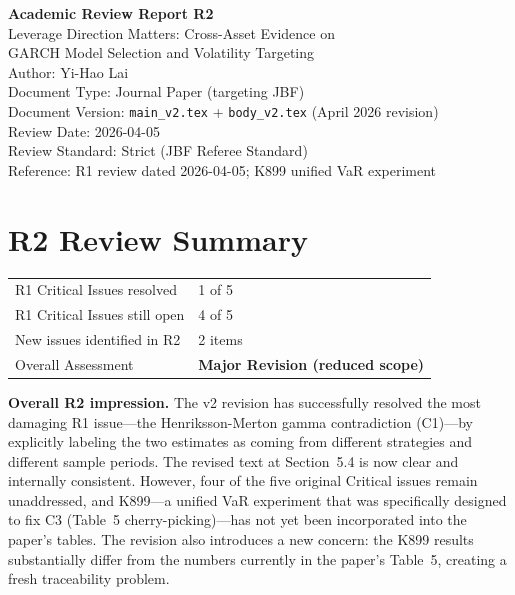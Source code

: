 \documentclass[12pt,a4paper]{article}
\begin{document}
\begin{center}
{\Large\bfseries Academic Review Report R2}\\[0.5em]
{\large Leverage Direction Matters: Cross-Asset Evidence on\\GARCH Model Selection and Volatility Targeting}\\[0.5em]
{\normalsize Author: Yi-Hao Lai}\\[0.3em]
{\normalsize Document Type: Journal Paper (targeting JBF)}\\
{\normalsize Document Version: \texttt{main\_v2.tex} + \texttt{body\_v2.tex} (April 2026 revision)}\\
{\normalsize Review Date: 2026-04-05}\\
{\normalsize Review Standard: Strict (JBF Referee Standard)}\\
{\normalsize Reference: R1 review dated 2026-04-05; K899 unified VaR experiment}
\end{center}

\bigskip

\section*{R2 Review Summary}

\begin{tabular}{ll}
\textcolor{resolved}{R1 Critical Issues resolved} & 1 of 5 \\
\textcolor{errorred}{R1 Critical Issues still open} & 4 of 5 \\
\textcolor{warncolor}{New issues identified in R2} & 2 items \\
Overall Assessment & \textbf{Major Revision (reduced scope)} \\
\end{tabular}

\medskip

\noindent\textbf{Overall R2 impression.} The v2 revision has successfully resolved the most damaging R1 issue---the Henriksson-Merton gamma contradiction (C1)---by explicitly labeling the two estimates as coming from different strategies and different sample periods. The revised text at Section~5.4 is now clear and internally consistent. However, four of the five original Critical issues remain unaddressed, and K899---a unified VaR experiment that was specifically designed to fix C3 (Table~5 cherry-picking)---has not yet been incorporated into the paper's tables. The revision also introduces a new concern: the K899 results substantially differ from the numbers currently in the paper's Table~5, creating a fresh traceability problem.
\end{document}
